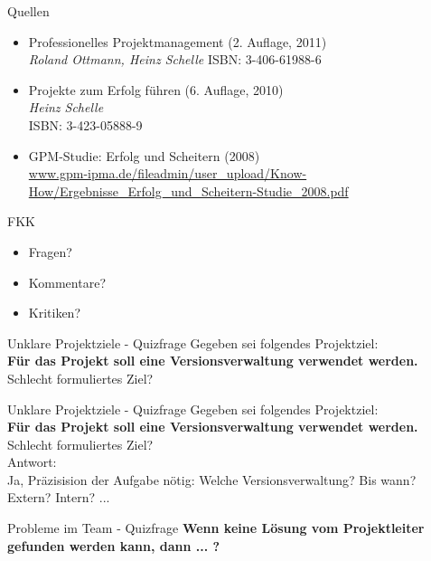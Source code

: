 \documentclass[12pt]{beamer}
\begin{document}
	\begin{frame}{Quellen}
		\begin{itemize}
			\item{Professionelles Projektmanagement (2. Auflage, 2011)\\
		\textit{Roland Ottmann, Heinz Schelle}
		ISBN: 3-406-61988-6}
			\item{Projekte zum Erfolg führen (6. Auflage, 2010)\\
		\textit{Heinz Schelle}\\
		ISBN: 3-423-05888-9}
			\item{GPM-Studie: Erfolg und Scheitern (2008)\\
		\url{www.gpm-ipma.de/fileadmin/user_upload/Know-How/Ergebnisse_Erfolg_und_Scheitern-Studie_2008.pdf}}
		\end{itemize}
		
	\end{frame}
	
	\begin{frame}{FKK}
		\begin{itemize}
			\item{Fragen?}
			\item{Kommentare?}
			\item{Kritiken?}
		\end{itemize}

	\end{frame}	
	
	
	\begin{frame}{Unklare Projektziele - Quizfrage}
		Gegeben sei folgendes Projektziel:\\
		\textbf{Für das Projekt soll eine Versionsverwaltung verwendet werden.} \\
		Schlecht formuliertes Ziel? \\
	\end{frame}

	\begin{frame}{Unklare Projektziele - Quizfrage}
		Gegeben sei folgendes Projektziel:\\
		\textbf{Für das Projekt soll eine Versionsverwaltung verwendet werden.} \\
		Schlecht formuliertes Ziel? \\
		Antwort: \\
		Ja, Präzisision der Aufgabe nötig: Welche Versionsverwaltung? Bis wann? Extern? Intern? ... 
	\end{frame}
	
	\begin{frame}{Probleme im Team - Quizfrage}
		\textbf{Wenn keine Lösung vom Projektleiter gefunden werden kann, dann ... ?}
	\end{frame}
	
\end{document}
